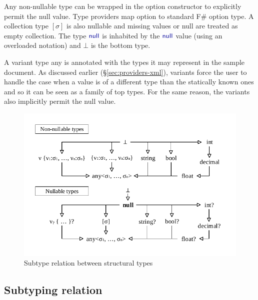 \documentclass[10pt,preprint,clearpagebib]{sigplanconf}
\newcommand{\kvd}[1]{\textnormal{\textcolor{kvdclr}{\sffamily #1}}}
\begin{document}
Any non-nullable type can be wrapped in the \kvd{option} constructor to explicitly permit the 
\kvd{null} value. Type providers map \kvd{option} to standard F\# option type. A collection 
type $[\sigma]$ is also nullable and missing values or \kvd{null} are treated as empty collection. 
The type $\kvd{null}$ is inhabited by the $\kvd{null}$ value (using an overloaded notation) and 
$\bot$ is the bottom type.

A variant type \kvd{any} is annotated with the types it may represent in the sample document.
As discussed earlier (\S\ref{sec:providers-xml}), variants force the user to handle the case when 
a value is of a different type than the statically known ones and so it can be seen as a family of 
top types. For the same reason, the variants also implicitly permit the \kvd{null} value. 


\begin{figure}
\begin{center}
\includegraphics[scale=0.80,trim=5mm 5mm 5mm 5mm,clip]{images/hierarchy.pdf} %
\end{center}
\vspace{-0.5em}
\caption{Subtype relation between structural types}
\label{fig:subtyping-diagram}
\vspace{-0.5em}
\end{figure}


\subsection{Subtyping relation}
\label{sec:inference-subtyping}
\end{document}
